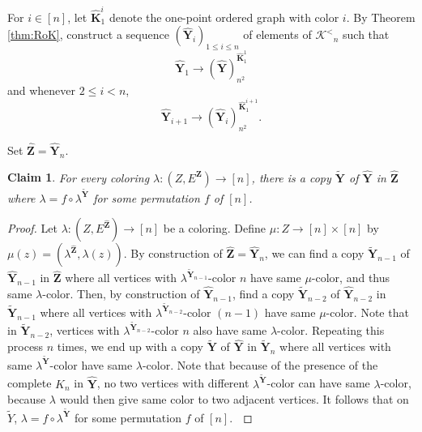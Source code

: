 \documentclass[reqno]{amsart}
\newtheorem{claimm}{Claim}
\begin{document}
For $i \in [n]$, let ${\widehat{\textbf{{K}}}}_1 ^i$ denote the one-point ordered graph with color $i$. By Theorem \ref{thm:RoK}, construct a sequence $({\widehat{\textbf{{Y}}}}_i)_{1\leq i \leq n}$ of elements of ${\mathcal{K}^<}_n$ such that \[ {\widehat{\textbf{{Y}}}}_1 {\longrightarrow {{({\widehat{\textbf{{Y}}}})}}^{{{\widehat{\textbf{{K}}}}_1 ^1}}_{{n^2}}} \] and whenever $2\leq i < n$, \[ {\widehat{\textbf{{Y}}}}_{i+1} {\longrightarrow {{({\widehat{\textbf{{Y}}}}_i)}}^{{{\widehat{\textbf{{K}}}}_1 ^{i+1}}}_{{n^2}}}. \] 

Set ${\widehat{\textbf{{Z}}}}={\widehat{\textbf{{Y}}}}_{n}$. 

\begin{claimm}
\label{lem:oKeq}
For every coloring $\lambda : {{(Z, E^{{\textbf{{Z}}}})} \longrightarrow {[n]}}$, there is a copy ${\widetilde{\textbf{{Y}}}}$ of ${\widehat{\textbf{{Y}}}}$ in ${\widehat{\textbf{{Z}}}}$ where $\lambda = f \circ \lambda^{{\widetilde{\textbf{{Y}}}}}$ for some permutation $f$ of $[n]$.   
\end{claimm}

\begin{proof}
Let $\lambda : {{(Z, E^{{\widehat{\textbf{{Z}}}}})} \longrightarrow {[n]}}$ be a coloring. Define $\mu : {{Z} \longrightarrow {[n]\times[n]}}$ by $\mu(z)=(\lambda^{{\widehat{\textbf{{Z}}}}}, \lambda(z))$. By construction of ${\widehat{\textbf{{Z}}}}={\widehat{\textbf{{Y}}}}_n$, we can find a copy ${\widetilde{\textbf{{Y}}}}_{n-1}$ of ${\widehat{\textbf{{Y}}}}_{n-1}$ in ${\widehat{\textbf{{Z}}}}$ where all vertices with $\lambda^{{\widetilde{\textbf{{Y}}}}_{n-1}}$-color $n$ have same $\mu$-color, and thus same $\lambda$-color. Then, by construction of ${\widehat{\textbf{{Y}}}}_{n-1}$, find a copy ${\widetilde{\textbf{{Y}}}}_{n-2}$ of ${\widehat{\textbf{{Y}}}}_{n-2}$ in ${\widetilde{\textbf{{Y}}}}_{n-1}$ where all vertices with $\lambda^{{\widetilde{\textbf{{Y}}}}_{n-2}}$-color $(n-1)$ have same $\mu$-color. Note that in ${\widetilde{\textbf{{Y}}}}_{n-2}$, vertices with $\lambda^{{\widetilde{\textbf{{Y}}}}_{n-2}}$-color $n$ also have same $\lambda$-color. Repeating this process $n$ times, we end up with a copy ${\widetilde{\textbf{{Y}}}}$ of ${\widehat{\textbf{{Y}}}}$ in ${\widetilde{\textbf{{Y}}}}_{n}$ where all vertices with same $\lambda^{{\widetilde{\textbf{{Y}}}}}$-color have same $\lambda$-color. Note that because of the presence of the complete $K_n$ in ${\widehat{\textbf{{Y}}}}$, no two vertices with different $\lambda^{{\widetilde{\textbf{{Y}}}}}$-color can have same $\lambda$-color, because $\lambda$ would then give same color to two adjacent vertices. It follows that on $\tilde{Y}$, $\lambda = f \circ \lambda^{{\widetilde{\textbf{{Y}}}}}$ for some permutation $f$ of $[n]$. $\qedhere$ \end{proof}
\end{document}
